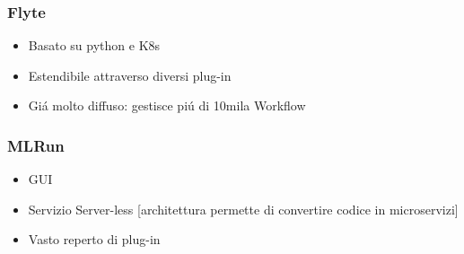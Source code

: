 \documentclass[xcolor=dvipsnames]{beamer}
\begin{document}
\begin{frame}
    \frametitle{Flyte}
\begin{itemize}
    \item Basato su python e K8s
    \item Estendibile attraverso diversi plug-in
    \item Giá molto diffuso: gestisce piú di 10mila Workflow
\end{itemize}
    

\end{frame}

\begin{frame}
    \frametitle{MLRun}
    \begin{itemize}
        \item GUI 
        \item Servizio Server-less [architettura permette di convertire codice in microservizi]
        \item Vasto reperto di plug-in
    \end{itemize}
    

\end{frame}
\end{document}
